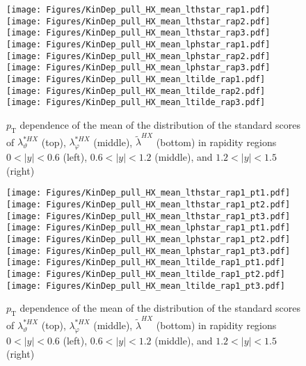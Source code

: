 \documentclass[12pt]{article}
\newcommand{\pT}{p_\mathrm{T}}
\newcommand{\absy}{\left |  y \right |}
\newcommand{\lamtildeHX}{\tilde{\lambda}^{\scriptscriptstyle HX}}
\newcommand{\lamthstarHX}{\lambda^{* \scriptscriptstyle HX}_\vartheta}
\newcommand{\lamphstarHX}{\lambda^{* \scriptscriptstyle HX}_\varphi}
\begin{document}
\begin{figure}[htbp]
\centering
\texttt{[image: Figures/KinDep\_pull\_HX\_mean\_lthstar\_rap1.pdf]}
\texttt{[image: Figures/KinDep\_pull\_HX\_mean\_lthstar\_rap2.pdf]}
\texttt{[image: Figures/KinDep\_pull\_HX\_mean\_lthstar\_rap3.pdf]}
\texttt{[image: Figures/KinDep\_pull\_HX\_mean\_lphstar\_rap1.pdf]}
\texttt{[image: Figures/KinDep\_pull\_HX\_mean\_lphstar\_rap2.pdf]}
\texttt{[image: Figures/KinDep\_pull\_HX\_mean\_lphstar\_rap3.pdf]}
\texttt{[image: Figures/KinDep\_pull\_HX\_mean\_ltilde\_rap1.pdf]}
\texttt{[image: Figures/KinDep\_pull\_HX\_mean\_ltilde\_rap2.pdf]}
\texttt{[image: Figures/KinDep\_pull\_HX\_mean\_ltilde\_rap3.pdf]}
\caption{$\pT$ dependence of the mean of the distribution of the standard scores
of $\lamthstarHX$ (top), $\lamphstarHX$ (middle), $\lamtildeHX$ (bottom) in rapidity
regions $0<\absy<0.6$ (left), $0.6<\absy<1.2$ (middle), and $1.2<\absy<1.5$ (right)}
\end{figure}
\clearpage


\begin{figure}[htbp]
\centering
\texttt{[image: Figures/KinDep\_pull\_HX\_mean\_lthstar\_rap1\_pt1.pdf]}
\texttt{[image: Figures/KinDep\_pull\_HX\_mean\_lthstar\_rap1\_pt2.pdf]}
\texttt{[image: Figures/KinDep\_pull\_HX\_mean\_lthstar\_rap1\_pt3.pdf]}
\texttt{[image: Figures/KinDep\_pull\_HX\_mean\_lphstar\_rap1\_pt1.pdf]}
\texttt{[image: Figures/KinDep\_pull\_HX\_mean\_lphstar\_rap1\_pt2.pdf]}
\texttt{[image: Figures/KinDep\_pull\_HX\_mean\_lphstar\_rap1\_pt3.pdf]}
\texttt{[image: Figures/KinDep\_pull\_HX\_mean\_ltilde\_rap1\_pt1.pdf]}
\texttt{[image: Figures/KinDep\_pull\_HX\_mean\_ltilde\_rap1\_pt2.pdf]}
\texttt{[image: Figures/KinDep\_pull\_HX\_mean\_ltilde\_rap1\_pt3.pdf]}
\caption{$\pT$ dependence of the mean of the distribution of the standard scores
of $\lamthstarHX$ (top), $\lamphstarHX$ (middle), $\lamtildeHX$ (bottom) in rapidity
regions $0<\absy<0.6$ (left), $0.6<\absy<1.2$ (middle), and $1.2<\absy<1.5$ (right)}
\end{figure}
\clearpage
\end{document}
